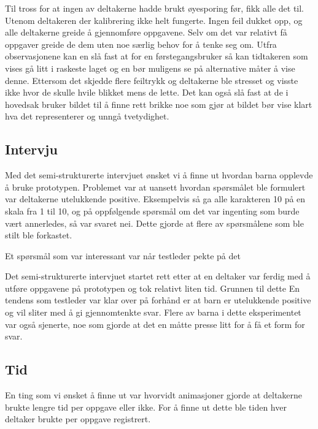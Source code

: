  
 
 
Til tross for at ingen av deltakerne hadde brukt øyesporing før, fikk alle det til. Utenom deltakeren der kalibrering ikke helt fungerte. Ingen feil dukket opp, og alle deltakerne greide å gjennomføre oppgavene. Selv om det var relativt få oppgaver greide de dem uten noe særlig behov for å tenke seg om. Utfra observasjonene kan en slå fast at for en førstegangsbruker så kan tidtakeren som vises gå litt i raskeste laget og en bør muligens se på alternative måter å vise denne. Ettersom det skjedde flere feiltrykk og deltakerne ble stresset og visste ikke hvor de skulle hvile blikket mens de lette. Det kan også slå fast at de i hovedsak bruker bildet til å finne rett brikke noe som gjør at bildet bør vise klart hva det representerer og unngå tvetydighet.  
 
 
 
 
\subsection{Intervju} 
 
 
Med det semi-strukturerte intervjuet ønsket vi å finne ut hvordan barna opplevde å bruke prototypen. Problemet var at uansett hvordan spørsmålet ble formulert var deltakerne utelukkende positive. Eksempelvis så ga alle karakteren 10 på en skala fra 1 til 10, og på oppfølgende spørsmål om det var ingenting som burde vært annerledes, så var svaret nei. Dette gjorde at flere av spørsmålene som ble stilt ble forkastet.  
 
 
Et spørsmål som var interessant var når testleder pekte på det 
 
 
Det semi-strukturerte intervjuet startet rett etter at en deltaker var ferdig med å utføre oppgavene på prototypen og tok relativt liten tid. Grunnen til dette  
En tendens som testleder var klar over på forhånd er at barn er utelukkende positive og vil sliter med å gi gjennomtenkte svar. Flere av barna i dette eksperimentet var også sjenerte, noe som gjorde at det en måtte presse litt for å få et form for svar.  
 
 
\subsection{Tid} 
 
 
En ting som vi ønsket å finne ut var hvorvidt animasjoner gjorde at deltakerne brukte lengre tid per oppgave eller ikke. For å finne ut dette ble tiden hver deltaker brukte per oppgave registrert.  
 
